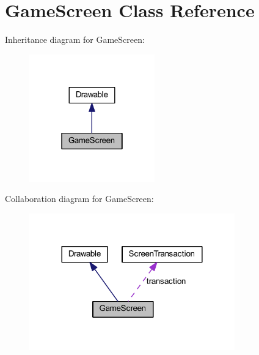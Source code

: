 \hypertarget{class_game_screen}{\section{Game\-Screen Class Reference}
\label{class_game_screen}
}


Inheritance diagram for Game\-Screen\-:\nopagebreak
\begin{figure}[H]
\begin{center}
\leavevmode
\includegraphics[width=154pt]{class_game_screen__inherit__graph}
\end{center}
\end{figure}


Collaboration diagram for Game\-Screen\-:\nopagebreak
\begin{figure}[H]
\begin{center}
\leavevmode
\includegraphics[width=252pt]{class_game_screen__coll__graph}
\end{center}
\end{figure}
